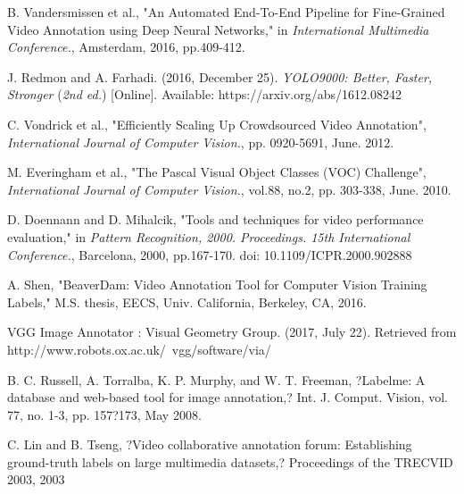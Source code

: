 \documentclass[conference]{IEEEtran}
\begin{document}
%
%

%
%

\begin{thebibliography}{9}

B. Vandersmissen et al., "An Automated End-To-End Pipeline for Fine-Grained Video Annotation using Deep Neural Networks," in 
\textit{International Multimedia Conference.}, Amsterdam, 2016, pp.409-412.
 
J. Redmon and A. Farhadi. (2016, December 25). 
\textit{YOLO9000: Better, Faster, Stronger} (\textit{2nd ed.}) [Online]. Available: https://arxiv.org/abs/1612.08242

C. Vondrick et al., "Efficiently Scaling Up Crowdsourced Video Annotation", \textit{International Journal of Computer Vision.}, pp. 0920-5691, June. 2012.

M. Everingham et al., "The Pascal Visual Object Classes (VOC) Challenge", \textit{International Journal of Computer Vision.}, vol.88, no.2, pp. 303-338, June. 2010.

D. Doennann and D. Mihalcik, "Tools and techniques for video performance evaluation," in 
\textit{Pattern Recognition, 2000. Proceedings. 15th International Conference.}, Barcelona, 2000, pp.167-170. doi: 10.1109/ICPR.2000.902888
    
A. Shen, "BeaverDam: Video Annotation Tool for Computer Vision Training Labels," M.S. thesis, EECS, Univ. California, Berkeley, CA, 2016.

VGG Image Annotator : Visual Geometry Group. (2017, July 22). Retrieved from http://www.robots.ox.ac.uk/~vgg/software/via/

B. C. Russell, A. Torralba, K. P. Murphy, and W. T. Freeman, ?Labelme: A database and web-based tool for image annotation,? Int. J. Comput. Vision, vol. 77, no. 1-3, pp. 157?173, May 2008.

C. Lin and B. Tseng, ?Video collaborative annotation forum: Establishing ground-truth labels on large multimedia datasets,? Proceedings of the TRECVID 2003, 2003


\end{thebibliography}
\end{document}
